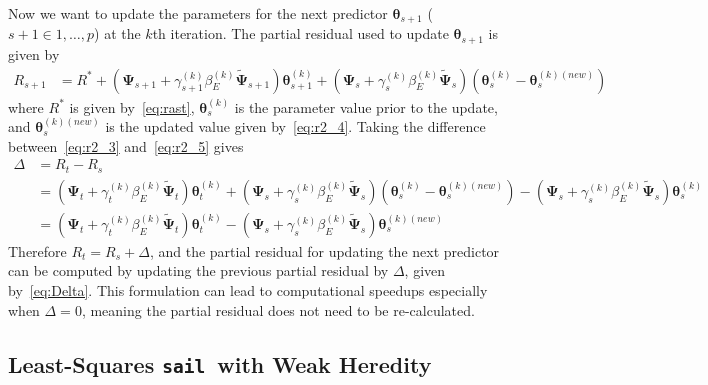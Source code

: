 \documentclass[12pt,letter]{article}\usepackage[]{graphicx}\usepackage[]{color}
\newcommand{\sail}{\texttt{sail}}
\newcommand{\btheta}{\boldsymbol{\theta}}
\newcommand{\bPsi}{\boldsymbol{\Psi}}
\begin{document}
Now we want to update the parameters for the next predictor $\btheta_{s+1}$ ($s+1 \in {1,\ldots, p}$) at the $k$th iteration. The partial residual used to update $\btheta_{s+1}$ is given by
\begin{align}
R_{s+1} & = R^\ast + (\bPsi_{s+1} + \gamma_{s+1}^{(k)}\beta_E^{(k)} \widetilde{\bPsi}_{s+1})\btheta_{s+1}^{(k)} + (\bPsi_s + \gamma_s^{(k)}\beta_E^{(k)} \widetilde{\bPsi}_s)(\btheta_s^{(k)} - \btheta_s^{(k)(new)}) \label{eq:r2_5}
\end{align}
where $R^\ast$ is given by~\eqref{eq:rast}, $\btheta_s^{(k)}$ is the parameter value prior to the update, and $\btheta_s^{(k)(new)}$ is the updated value given by~\eqref{eq:r2_4}. Taking the difference between~\eqref{eq:r2_3} and~\eqref{eq:r2_5} gives
\begin{align}
\Delta & = R_t - R_s \nonumber\\
& = (\bPsi_t + \gamma_t^{(k)}\beta_E^{(k)} \widetilde{\bPsi}_t)\btheta_t^{(k)} + (\bPsi_s + \gamma_s^{(k)}\beta_E^{(k)} \widetilde{\bPsi}_s)(\btheta_s^{(k)} - \btheta_s^{(k)(new)}) - (\bPsi_s + \gamma_s^{(k)}\beta_E^{(k)} \widetilde{\bPsi}_s)\btheta_s^{(k)} \nonumber\\
& = (\bPsi_t + \gamma_t^{(k)}\beta_E^{(k)} \widetilde{\bPsi}_t)\btheta_t^{(k)} - (\bPsi_s + \gamma_s^{(k)}\beta_E^{(k)} \widetilde{\bPsi}_s)\btheta_s^{(k)(new)} \label{eq:Delta}
\end{align}
Therefore $R_t = R_s + \Delta$, and the partial residual for updating the next predictor can be computed by updating the previous partial residual by $\Delta$, given by~\eqref{eq:Delta}. This formulation can lead to computational speedups especially when $\Delta = 0$, meaning the partial residual does not need to be re-calculated.



\subsection{Least-Squares \sail ~with Weak Heredity} \label{ap:subsec:lssailweak}
\end{document}
